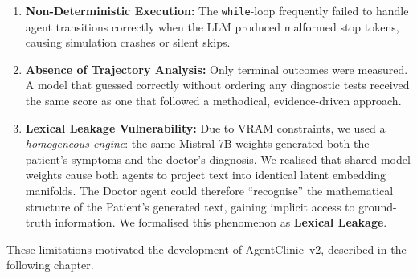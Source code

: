 \begin{enumerate}
    \item \textbf{Non-Deterministic Execution:} The \texttt{while}-loop frequently failed to handle agent transitions correctly when the LLM produced malformed stop tokens, causing simulation crashes or silent skips.
    \item \textbf{Absence of Trajectory Analysis:} Only terminal outcomes were measured. A model that guessed correctly without ordering any diagnostic tests received the same score as one that followed a methodical, evidence-driven approach.
    \item \textbf{Lexical Leakage Vulnerability:} Due to VRAM constraints, we used a \textit{homogeneous engine}: the same Mistral-7B weights generated both the patient's symptoms and the doctor's diagnosis. We realised that shared model weights cause both agents to project text into identical latent embedding manifolds. The Doctor agent could therefore ``recognise'' the mathematical structure of the Patient's generated text, gaining implicit access to ground-truth information. We formalised this phenomenon as \textbf{Lexical Leakage}.
\end{enumerate}

These limitations motivated the development of AgentClinic~v2, described in the following chapter.
